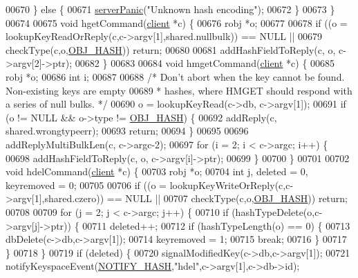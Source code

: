 \begin{DoxyCode}
00670     \} \textcolor{keywordflow}{else} \{
00671         \hyperlink{server_8h_a11cc378e7778a830b41240578de3b204}{serverPanic}(\textcolor{stringliteral}{"Unknown hash encoding"});
00672     \}
00673 \}
00674 
00675 \textcolor{keywordtype}{void} hgetCommand(\hyperlink{structclient}{client} *c) \{
00676     robj *o;
00677 
00678     \textcolor{keywordflow}{if} ((o = lookupKeyReadOrReply(c,c->argv[1],shared.nullbulk)) == NULL ||
00679         checkType(c,o,\hyperlink{server_8h_a87c05ba4f7f36741864277f02a4423fb}{OBJ\_HASH})) \textcolor{keywordflow}{return};
00680 
00681     addHashFieldToReply(c, o, c->argv[2]->ptr);
00682 \}
00683 
00684 \textcolor{keywordtype}{void} hmgetCommand(\hyperlink{structclient}{client} *c) \{
00685     robj *o;
00686     \textcolor{keywordtype}{int} i;
00687 
00688     \textcolor{comment}{/* Don't abort when the key cannot be found. Non-existing keys are empty}
00689 \textcolor{comment}{     * hashes, where HMGET should respond with a series of null bulks. */}
00690     o = lookupKeyRead(c->db, c->argv[1]);
00691     \textcolor{keywordflow}{if} (o != NULL && o->type != \hyperlink{server_8h_a87c05ba4f7f36741864277f02a4423fb}{OBJ\_HASH}) \{
00692         addReply(c, shared.wrongtypeerr);
00693         \textcolor{keywordflow}{return};
00694     \}
00695 
00696     addReplyMultiBulkLen(c, c->argc-2);
00697     \textcolor{keywordflow}{for} (i = 2; i < c->argc; i++) \{
00698         addHashFieldToReply(c, o, c->argv[i]->ptr);
00699     \}
00700 \}
00701 
00702 \textcolor{keywordtype}{void} hdelCommand(\hyperlink{structclient}{client} *c) \{
00703     robj *o;
00704     \textcolor{keywordtype}{int} j, deleted = 0, keyremoved = 0;
00705 
00706     \textcolor{keywordflow}{if} ((o = lookupKeyWriteOrReply(c,c->argv[1],shared.czero)) == NULL ||
00707         checkType(c,o,\hyperlink{server_8h_a87c05ba4f7f36741864277f02a4423fb}{OBJ\_HASH})) \textcolor{keywordflow}{return};
00708 
00709     \textcolor{keywordflow}{for} (j = 2; j < c->argc; j++) \{
00710         \textcolor{keywordflow}{if} (hashTypeDelete(o,c->argv[j]->ptr)) \{
00711             deleted++;
00712             \textcolor{keywordflow}{if} (hashTypeLength(o) == 0) \{
00713                 dbDelete(c->db,c->argv[1]);
00714                 keyremoved = 1;
00715                 \textcolor{keywordflow}{break};
00716             \}
00717         \}
00718     \}
00719     \textcolor{keywordflow}{if} (deleted) \{
00720         signalModifiedKey(c->db,c->argv[1]);
00721         notifyKeyspaceEvent(\hyperlink{server_8h_afe25ae13417e6fa5011e7efc69a34bc0}{NOTIFY\_HASH},\textcolor{stringliteral}{"hdel"},c->argv[1],c->db->id);

\end{DoxyCode}
